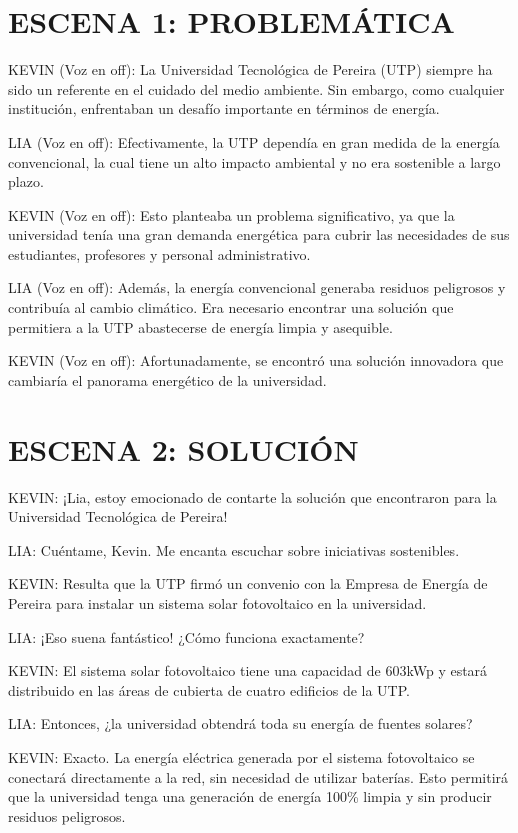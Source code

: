 \documentclass{article}
\begin{document}
\section*{ESCENA 1: PROBLEMÁTICA}

KEVIN (Voz en off): La Universidad Tecnológica de Pereira (UTP) siempre ha sido un referente en el cuidado del medio ambiente. Sin embargo, como cualquier institución, enfrentaban un desafío importante en términos de energía.

LIA (Voz en off): Efectivamente, la UTP dependía en gran medida de la energía convencional, la cual tiene un alto impacto ambiental y no era sostenible a largo plazo.

KEVIN (Voz en off): Esto planteaba un problema significativo, ya que la universidad tenía una gran demanda energética para cubrir las necesidades de sus estudiantes, profesores y personal administrativo.

LIA (Voz en off): Además, la energía convencional generaba residuos peligrosos y contribuía al cambio climático. Era necesario encontrar una solución que permitiera a la UTP abastecerse de energía limpia y asequible.

KEVIN (Voz en off): Afortunadamente, se encontró una solución innovadora que cambiaría el panorama energético de la universidad.

\section*{ESCENA 2: SOLUCIÓN}

KEVIN: ¡Lia, estoy emocionado de contarte la solución que encontraron para la Universidad Tecnológica de Pereira!

LIA: Cuéntame, Kevin. Me encanta escuchar sobre iniciativas sostenibles.

KEVIN: Resulta que la UTP firmó un convenio con la Empresa de Energía de Pereira para instalar un sistema solar fotovoltaico en la universidad.

LIA: ¡Eso suena fantástico! ¿Cómo funciona exactamente?

KEVIN: El sistema solar fotovoltaico tiene una capacidad de 603kWp y estará distribuido en las áreas de cubierta de cuatro edificios de la UTP.

LIA: Entonces, ¿la universidad obtendrá toda su energía de fuentes solares?

KEVIN: Exacto. La energía eléctrica generada por el sistema fotovoltaico se conectará directamente a la red, sin necesidad de utilizar baterías. Esto permitirá que la universidad tenga una generación de energía 100\% limpia y sin producir residuos peligrosos.
\end{document}
